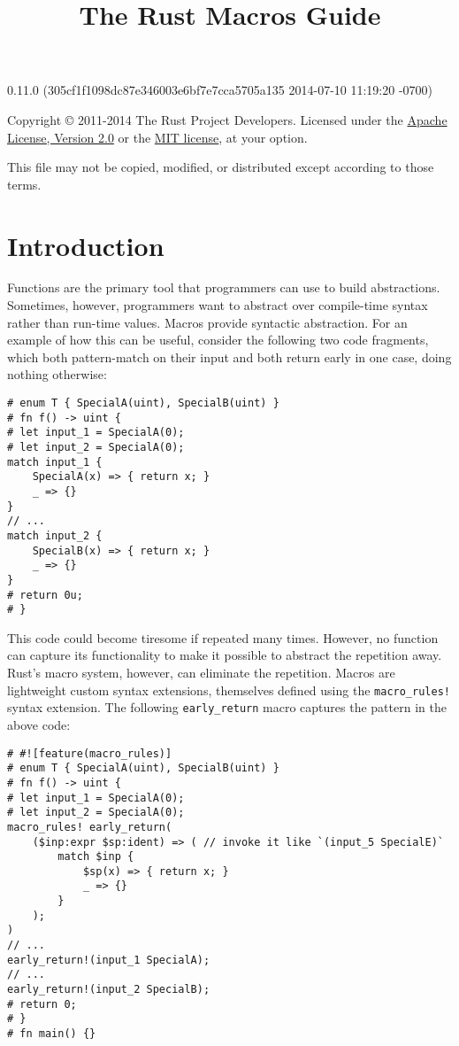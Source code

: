 \documentclass[]{article}
\title{The Rust Macros Guide}
\begin{document}
\maketitle

0.11.0 (305cf1f1098dc87e346003e6bf7e7cca5705a135 2014-07-10 11:19:20 -0700)

Copyright © 2011-2014 The Rust Project Developers. Licensed under the
\href{http://www.apache.org/licenses/LICENSE-2.0}{Apache License,
Version 2.0} or the \href{http://opensource.org/licenses/MIT}{MIT
license}, at your option.

This file may not be copied, modified, or distributed except according
to those terms.

{
\hypersetup{linkcolor=black}
\setcounter{tocdepth}{3}
\tableofcontents
}
\section{Introduction}\label{introduction}

Functions are the primary tool that programmers can use to build
abstractions. Sometimes, however, programmers want to abstract over
compile-time syntax rather than run-time values. Macros provide
syntactic abstraction. For an example of how this can be useful,
consider the following two code fragments, which both pattern-match on
their input and both return early in one case, doing nothing otherwise:

\begin{verbatim}
# enum T { SpecialA(uint), SpecialB(uint) }
# fn f() -> uint {
# let input_1 = SpecialA(0);
# let input_2 = SpecialA(0);
match input_1 {
    SpecialA(x) => { return x; }
    _ => {}
}
// ...
match input_2 {
    SpecialB(x) => { return x; }
    _ => {}
}
# return 0u;
# }
\end{verbatim}

This code could become tiresome if repeated many times. However, no
function can capture its functionality to make it possible to abstract
the repetition away. Rust's macro system, however, can eliminate the
repetition. Macros are lightweight custom syntax extensions, themselves
defined using the \texttt{macro\_rules!} syntax extension. The following
\texttt{early\_return} macro captures the pattern in the above code:

\begin{verbatim}
# #![feature(macro_rules)]
# enum T { SpecialA(uint), SpecialB(uint) }
# fn f() -> uint {
# let input_1 = SpecialA(0);
# let input_2 = SpecialA(0);
macro_rules! early_return(
    ($inp:expr $sp:ident) => ( // invoke it like `(input_5 SpecialE)`
        match $inp {
            $sp(x) => { return x; }
            _ => {}
        }
    );
)
// ...
early_return!(input_1 SpecialA);
// ...
early_return!(input_2 SpecialB);
# return 0;
# }
# fn main() {}
\end{verbatim}
\end{document}
